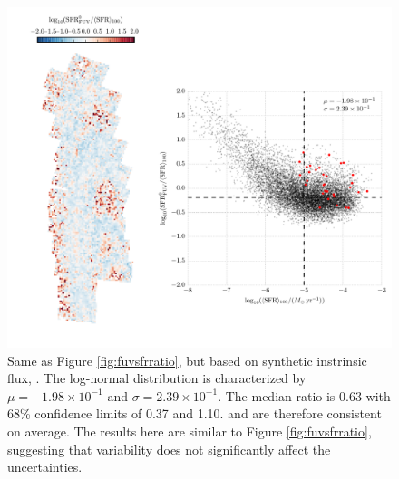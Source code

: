 \documentclass[iop, tighten]{emulateapj}
\begin{document}
\begin{figure}
\centering
\includegraphics[width=\textwidth]{m31flux-figures/sfr_fuv0-vs-mean.pdf}
\caption[Ratio of the \sfr{} based on the synthetic intrinsic \fuv{} flux to
the $100\myr$ mean \sfr{}.]{Same as Figure \ref{fig:fuvsfrratio}, but based on
    synthetic instrinsic flux, \sfrfuvz{}. The log-normal distribution is
    characterized by $\mu = -1.98\times 10^{-1}$ and $\sigma = 2.39\times
    10^{-1}$. The median ratio is 0.63 with 68\% confidence limits of 0.37 and
    1.10. \sfrfuvz{} and \sfroneh{} are therefore consistent on average. The
    results here are similar to Figure \ref{fig:fuvsfrratio}, suggesting that
    \sfh{} variability does not significantly affect the \sfrfuv{}
    uncertainties.
}
\label{fig:fuvzsfrratio}
\end{figure}
\end{document}

